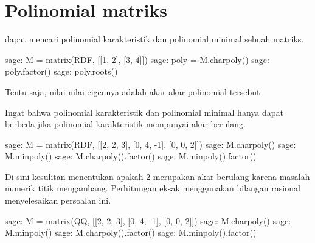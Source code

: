 





\section{Polinomial matriks}

\Sage{} dapat mencari polinomial karakteristik dan polinomial minimal sebuah
matriks.
\begin{sagecommandline}
sage: M =  matrix(RDF, [[1, 2], [3, 4]]) 
sage: poly = M.charpoly()
sage: poly.factor()
sage: poly.roots()
\end{sagecommandline}
Tentu saja, nilai-nilai eigennya adalah akar-akar polinomial tersebut.

Ingat bahwa polinomial karakteristik dan polinomial minimal hanya dapat
berbeda jika polinomial karakteristik mempunyai akar berulang.
\begin{sagecommandline}
sage: M =  matrix(RDF, [[2, 2, 3], [0, 4, -1], [0, 0, 2]]) 
sage: M.charpoly()
sage: M.minpoly()
sage: M.charpoly().factor()
sage: M.minpoly().factor()
\end{sagecommandline}
Di sini \Sage{} kesulitan menentukan apakah $2$ merupakan akar berulang karena
masalah numerik titik mengambang.
Perhitungan eksak menggunakan bilangan rasional menyelesaikan persoalan ini.
\begin{sagecommandline}
sage: M =  matrix(QQ, [[2, 2, 3], [0, 4, -1], [0, 0, 2]]) 
sage: M.charpoly()
sage: M.minpoly()
sage: M.charpoly().factor()
sage: M.minpoly().factor()
\end{sagecommandline}

